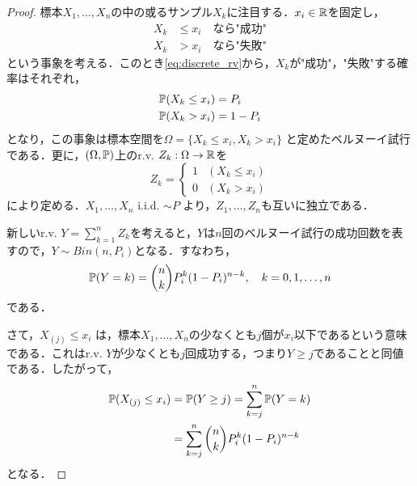\documentclass[main.tex]{subfiles}
\begin{document}
\begin{proof}  
  
  標本$X_1, \dots, X_n$の中の或るサンプル$X_k$に注目する．$x_i \in \mathbb{R}$を固定し，
  \begin{align*}
    X_k &\leq x_i \quad \text{なら"成功"} \\
    X_k &> x_i \quad \text{なら"失敗"}
  \end{align*}
  という事象を考える．このとき\eqref{eq:discrete_rv}から，$X_k$が"成功"，"失敗"する確率はそれぞれ，
  \begin{equation}
    \begin{split}
      \mathbb{P}(X_k \leq x_i) &= P_i  \\
      \mathbb{P}(X_k > x_i) &= 1 - P_i 
    \end{split}
  \end{equation}
  となり，この事象は標本空間を$\Omega = \{X_k \leq x_i, X_k > x_i\}$ と定めたベルヌーイ試行である．更に，$(\Omega, \mathbb{P})$上のr.v. $Z_k: \Omega \to \mathbb{R}$を
  \begin{equation}
    Z_k = \begin{cases}
      1 & (X_k \leq x_i) \\
      0 & (X_k > x_i)
    \end{cases}
  \end{equation}
  により定める．$X_1, \dots, X_n$ i.i.d. $\sim P$ より，$Z_1, \dots, Z_n$も互いに独立である．

  新しいr.v. $Y = \sum_{k=1}^{n} Z_k$を考えると，$Y$は$n$回のベルヌーイ試行の成功回数を表すので，$Y \sim Bin(n,P_i)$となる．すなわち，
  \begin{equation}
    \mathbb{P}(Y = k) = \binom{n}{k} P_i^k (1-P_i)^{n-k}, \quad k=0, 1, \dots, n
  \end{equation}
 である．

  さて，$X_{(j)} \leq x_i$ は，標本$X_1, \dots, X_n$の少なくとも$j$個が$x_i$以下であるという意味である．これはr.v. $Y$が少なくとも$j$回成功する，つまり$Y \geq j$であることと同値である．したがって，
  \begin{align}
    \mathbb{P}(X_{(j)} \leq x_i) &= \mathbb{P}(Y \geq j) = \sum_{k=j}^{n} \mathbb{P} (Y=k) \notag \\
                          &= \sum_{k=j}^{n} \binom{n}{k} P_i^k (1-P_i)^{n-k}
  \end{align}
  となる．
\end{proof}
\end{document}

